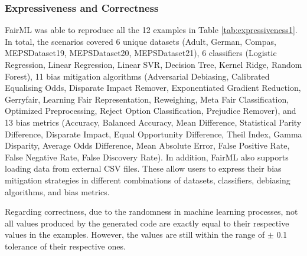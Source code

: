 \documentclass[sigconf]{acmart}
\begin{document}
{	\subsubsection{Expressiveness and Correctness}
	\label{sec:expressiveness_and_correctness}
	FairML was able to reproduce all the 12 examples in Table \ref{tab:expressiveness1}.
	In total, the scenarios covered 6 unique datasets 
	(Adult, German, Compas, MEPSDataset19, MEPSDataset20, MEPSDataset21),
	6 classifiers (Logistic Regression, Linear Regression, Linear SVR, Decision Tree, Kernel Ridge, Random Forest), 
	11 bias mitigation algorithms 
	(Adversarial Debiasing, Calibrated Equalising Odds, Disparate Impact Remover, Exponentiated Gradient Reduction, Gerryfair, Learning Fair Representation, Reweighing, Meta Fair Classification, Optimized Preprocessing, Reject Option Classification, Prejudice Remover), 
	and 
	13 bias metrics 
	(Accuracy, Balanced Accuracy, Mean Difference, Statistical Parity Difference, Disparate Impact, Equal Opportunity Difference, Theil Index, Gamma Disparity, Average Odds Difference, Mean Absolute Error, False Positive Rate, False Negative Rate, False Discovery Rate). 
	In addition, FairML also supports loading data from external CSV files. 
	These allow users to express their bias mitigation strategies in different combinations of datasets, classifiers, debiasing algorithms, and bias metrics.
	
	Regarding correctness, due to the randomness in machine learning processes, not all values produced by the generated code are exactly equal to their respective values in the examples. However, the values are still within the range of $\pm$ 0.1 tolerance of their respective ones.
	
	
}
\end{document}
